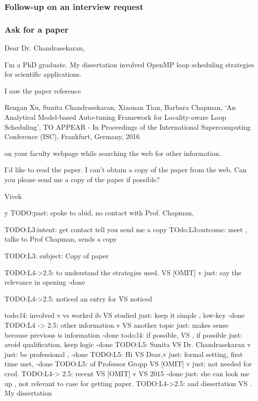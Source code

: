 \begin{frame} 

\frametitle{ Follow-up on an interview request} 





\end{frame} 



\begin{frame} 
\frametitle{Ask for a paper}

Dear Dr. Chandrasekaran,

I'm a PhD graduate. My dissertation involved OpenMP loop scheduling
strategies for scientific applications.

I saw the paper reference 

Rengan Xu, Sunita Chandrasekaran, Xiaonan Tian, Barbara Chapman, `An
Analytical Model-based Auto-tuning Framework for Locality-aware Loop
Scheduling', TO APPEAR - In Proceedings of the International
Supercomputing Conference (ISC), Frankfurt, Germany, 2016

on your faculty webpage while searching the web for other information.

I'd like to read the paper. I can't obtain a copy of the paper from
the web. Can you please send me a copy of the paper if possible?

Vivek

\end{frame} 
y
TODO:past: spoke to abid, no contact with Prof. Chapman, 

TODO:L3:intent: get contact   tell you  send me a copy 
TOdo:L3:outcome: meet , talks to Prof Chapman, sends a copy 



TODO:L3: subject: Copy of paper


TODO:L4->2.5: to understand the strategies used.  VS [OMIT] v  just:
say the relevance in opening -done 

TODO:L4->2.5: noticed an entry for VS noticed 

todo:l4: involved v vs workrd ib VS studied  just: keep it simple ,
low-key  -done 
TODO:L4 -> 2.5: other information v VS another topic  just: makes
sense because previous is information  -done 
todo:l4: if possible,  VS , if possible  just: avoid qualification,
keep logic  -done  
TODO:L5: Sunita VS Dr. Chandrasekaran v  just: be professional , -done 
TODO:L5: Hi VS Dear,v just:  formal setting, first time met,  -done  
TODO:L5: of Professor Gropp VS [OMIT] v  just: not needed for cred.   
TODO:L4-> 2.5: recent  VS [OMIT] v VS 2015 -done just: she can look me
up , not relevant to case for getting paper. 
TODO:L4->2.5: and dissertation  VS . My dissertation 

